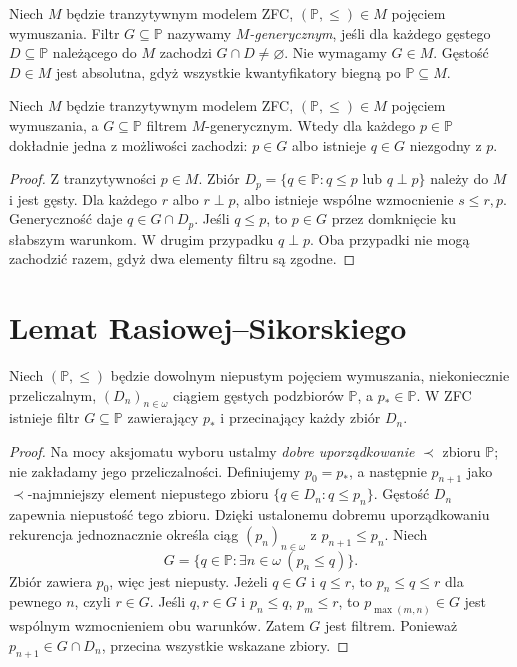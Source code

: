 \begin{definicja}\label{def:forcing-generic}
Niech $M$ będzie tranzytywnym modelem ZFC,
$(\mathbb P,\leq)\in M$ pojęciem wymuszania.
Filtr $G\subseteq\mathbb P$ nazywamy
\emph{$M$-generycznym}, jeśli dla każdego
gęstego $D\subseteq\mathbb P$ należącego do
$M$ zachodzi $G\cap D\ne\varnothing$.
Nie wymagamy $G\in M$. Gęstość $D\in M$ jest
absolutna, gdyż wszystkie kwantyfikatory
biegną po $\mathbb P\subseteq M$.
\end{definicja}

\begin{lemat}
\label{lem:forcing-generic-decision}
Niech $M$ będzie tranzytywnym modelem ZFC,
$(\mathbb P,\leq)\in M$ pojęciem wymuszania,
a $G\subseteq\mathbb P$ filtrem $M$-generycznym.
Wtedy dla każdego $p\in\mathbb P$ dokładnie
jedna z możliwości zachodzi:
$p\in G$ albo istnieje $q\in G$ niezgodny z $p$.
\end{lemat}
\begin{proof}
Z tranzytywności $p\in M$. Zbiór
$D_p=\{q\in\mathbb P:q\leq p\text{ lub }q\perp p\}$
należy do $M$ i jest gęsty. Dla każdego $r$
albo $r\perp p$, albo istnieje wspólne
wzmocnienie $s\leq r,p$. Generyczność
daje $q\in G\cap D_p$. Jeśli $q\leq p$,
to $p\in G$ przez domknięcie ku słabszym
warunkom. W drugim przypadku $q\perp p$.
Oba przypadki nie mogą zachodzić razem,
gdyż dwa elementy filtru są zgodne.
\end{proof}

\section{Lemat Rasiowej--Sikorskiego}
\begin{twierdzenie}
\label{thm:rasiowa-sikorski}
Niech $(\mathbb P,\leq)$ będzie dowolnym
niepustym pojęciem wymuszania, niekoniecznie
przeliczalnym, $(D_n)_{n\in\omega}$ ciągiem
gęstych podzbiorów $\mathbb P$, a
$p_*\in\mathbb P$. W ZFC istnieje
filtr $G\subseteq\mathbb P$ zawierający
$p_*$ i przecinający każdy zbiór $D_n$.
\end{twierdzenie}
\begin{proof}
Na mocy aksjomatu wyboru ustalmy
\emph{dobre uporządkowanie} $\prec$ zbioru
$\mathbb P$; nie zakładamy jego przeliczalności.
Definiujemy $p_0=p_*$, a następnie $p_{n+1}$
jako $\prec$-najmniejszy element niepustego
zbioru $\{q\in D_n:q\leq p_n\}$.
Gęstość $D_n$ zapewnia niepustość tego zbioru.
Dzięki ustalonemu dobremu uporządkowaniu
rekurencja jednoznacznie określa ciąg
$(p_n)_{n\in\omega}$ z $p_{n+1}\leq p_n$.
Niech
\[
 G=\{q\in\mathbb P:\exists n\in\omega\ (p_n\leq q)\}.
\]
Zbiór zawiera $p_0$, więc jest niepusty.
Jeżeli $q\in G$ i $q\leq r$,
to $p_n\leq q\leq r$ dla pewnego $n$,
czyli $r\in G$. Jeśli $q,r\in G$
i $p_n\leq q$, $p_m\leq r$, to
$p_{\max(m,n)}\in G$ jest wspólnym
wzmocnieniem obu warunków. Zatem $G$
jest filtrem. Ponieważ $p_{n+1}\in G\cap D_n$,
przecina wszystkie wskazane zbiory.
\end{proof}

